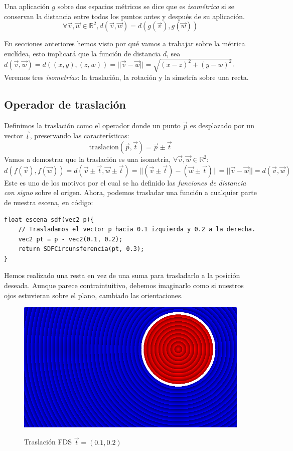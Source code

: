 \begin{definition}
Una aplicación \(g\) sobre dos espacios métricos se dice que es \textit{isométrica} si se conservan la distancia entre todos los puntos antes y después de su aplicación. \[\forall \Vec{v},\Vec{w} \in\mathbb{R}^2, d(\Vec{v},\Vec{w})=d(g(\Vec{v}),g(\Vec{w}))\]
\end{definition}

En secciones anteriores hemos visto por qué vamos a trabajar sobre la métrica euclídea, esto implicará que la función de distancia \(d\), sea  \(d(\Vec{v},\Vec{w})=d((x,y),(z,w))=\vert\vert \Vec{v}-\Vec{w}\vert\vert=\sqrt{(x-z)^2+(y-w)^2}\). Veremos tres \textit{isometrías}: la traslación, la rotación y la simetría sobre una recta.

\subsection{Operador de traslación}
Definimos la traslación como el operador donde un punto \(\Vec{p}\) es desplazado por un vector \(\Vec{t}\), preservando las características:
\[\text{traslacion}(\Vec{p},\Vec{t})=\Vec{p}\pm\Vec{t}\]
Vamos a demostrar que la traslación es una isometría, \(\forall \Vec{v},\Vec{w}\in\mathbb{R}^2\):
\[d(f(\Vec{v}), f(\Vec{w}))=d(\Vec{v}\pm\Vec{t}, \Vec{w}\pm\Vec{t})=\vert\vert (\Vec{v}\pm\Vec{t})-(\Vec{w}\pm\Vec{t})\vert\vert=\vert\vert \Vec{v}-\Vec{w}\vert\vert=d(\Vec{v}, \Vec{w})\]
Este es uno de los motivos por el cual se ha definido las \textit{funciones de distancia con signo} sobre el origen. Ahora, podemos trasladar una función a cualquier parte de nuestra escena, en código:
\newpage
\begin{lstlisting}
float escena_sdf(vec2 p){
    // Trasladamos el vector p hacia 0.1 izquierda y 0.2 a la derecha.
    vec2 pt = p - vec2(0.1, 0.2);
    return SDFCircunsferencia(pt, 0.3);
}
\end{lstlisting}

Hemos realizado una resta en vez de una suma para trasladarlo a la posición deseada. Aunque parece contraintuitivo, debemos imaginarlo como si nuestros ojos estuvieran sobre el plano, cambiado las orientaciones.

\begin{figure}[H]
  \centering
  \captionsetup{justification=centering}%
  \includegraphics[width=1.0\textwidth]{secciones/imagenes/sdf/2d/sdf_traslacion.png}\label{fig:traslacion}
  \caption{Traslación FDS \(\Vec{t}=(0.1, 0.2)\)}
\end{figure}

